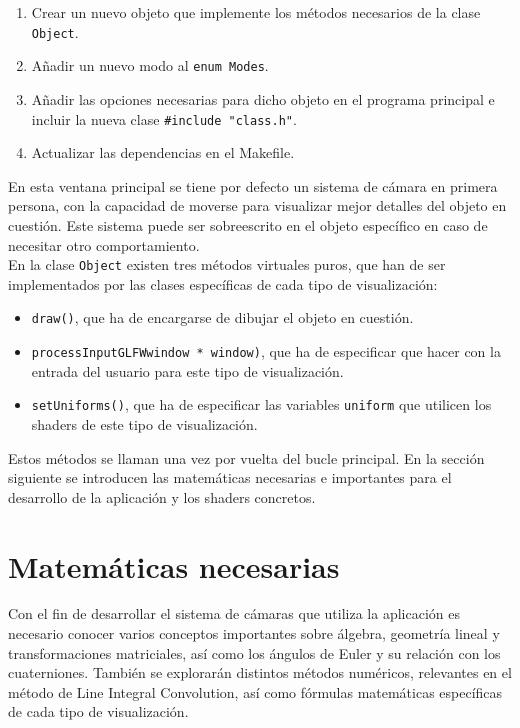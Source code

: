 \begin{enumerate}
		\item Crear un nuevo objeto que implemente los métodos necesarios
				de la clase \verb|Object|.
		\item Añadir un nuevo modo al \verb|enum Modes|.
		\item Añadir las opciones necesarias para dicho objeto en el programa
				principal e incluir la nueva clase \verb|#include "class.h"|.
		\item Actualizar las dependencias en el Makefile.
\end{enumerate}

En esta ventana principal se tiene por defecto un sistema de cámara en primera
persona, con la capacidad de moverse para visualizar mejor detalles del objeto
en cuestión. Este sistema puede ser sobreescrito en el objeto específico en
caso de necesitar otro comportamiento. \\

En la clase \verb|Object| existen tres métodos virtuales puros, que han de ser
implementados por las clases específicas de cada tipo de visualización:

\begin{itemize}
		\item \verb|draw()|, que ha de encargarse de dibujar el objeto en
				cuestión.
		\item \verb|processInputGLFWwindow * window)|, que ha de especificar que
				hacer con la entrada del usuario para este tipo de
				visualización.
		\item \verb|setUniforms()|, que ha de especificar las variables
				\verb|uniform| que utilicen los shaders de este tipo de
				visualización.
\end{itemize}

Estos métodos se llaman una vez por vuelta del bucle principal. En la sección
siguiente se introducen las matemáticas necesarias e importantes para el
desarrollo de la aplicación y los shaders concretos.

\section{Matemáticas necesarias}
\label{makereference5.4}

Con el fin de desarrollar el sistema de cámaras que utiliza la aplicación es
necesario conocer varios conceptos importantes sobre álgebra, geometría lineal y
transformaciones matriciales, así como los ángulos de Euler y su relación con
los cuaterniones. También se explorarán distintos métodos numéricos, relevantes
en el método de Line Integral Convolution, así como fórmulas matemáticas
específicas de cada tipo de visualización.

